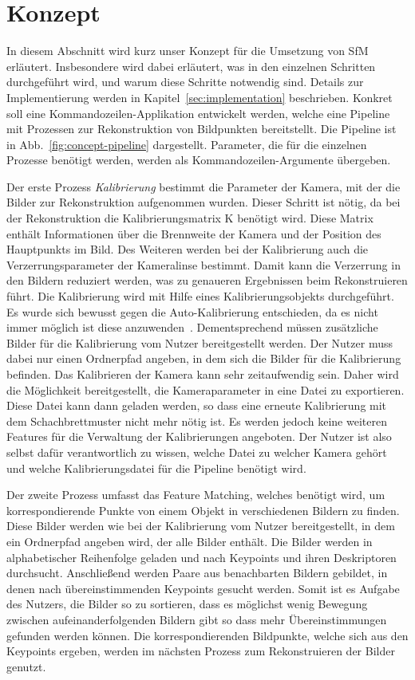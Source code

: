 
\chapter{Konzept}
In diesem Abschnitt wird kurz unser Konzept für die Umsetzung von SfM erläutert. 
Insbesondere wird dabei erläutert, was in den einzelnen Schritten durchgeführt wird, und warum diese Schritte notwendig sind.
Details zur Implementierung werden in Kapitel~\ref{sec:implementation} beschrieben.
Konkret soll eine Kommandozeilen-Applikation entwickelt werden, welche eine Pipeline mit Prozessen zur Rekonstruktion von Bildpunkten bereitstellt.
Die Pipeline ist in Abb.~\ref{fig:concept-pipeline} dargestellt.
Parameter, die für die einzelnen Prozesse benötigt werden, werden als Kommandozeilen-Argumente übergeben.

Der erste Prozess \emph{Kalibrierung} bestimmt die Parameter der Kamera, mit der die Bilder zur Rekonstruktion aufgenommen wurden.
Dieser Schritt ist nötig, da bei der Rekonstruktion die Kalibrierungsmatrix K benötigt wird.
Diese Matrix enthält Informationen über die Brennweite der Kamera und der Position des Hauptpunkts im Bild.
Des Weiteren werden bei der Kalibrierung auch die Verzerrungsparameter der Kameralinse bestimmt.
Damit kann die Verzerrung in den Bildern reduziert werden, was zu genaueren Ergebnissen beim Rekonstruieren führt.
Die Kalibrierung wird mit Hilfe eines Kalibrierungsobjekts durchgeführt.
Es wurde sich bewusst gegen die Auto-Kalibrierung entschieden, da es nicht immer möglich ist diese anzuwenden~\cite{remondino_2005}.
Dementsprechend müssen zusätzliche Bilder für die Kalibrierung vom Nutzer bereitgestellt werden.
Der Nutzer muss dabei nur einen Ordnerpfad angeben, in dem sich die Bilder für die Kalibrierung befinden.
Das Kalibrieren der Kamera kann sehr zeitaufwendig sein.
Daher wird die Möglichkeit bereitgestellt, die Kameraparameter in eine Datei zu exportieren.
Diese Datei kann dann geladen werden, so dass eine erneute Kalibrierung mit dem Schachbrettmuster nicht mehr nötig ist. 
Es werden jedoch keine weiteren Features für die Verwaltung der Kalibrierungen angeboten.
Der Nutzer ist also selbst dafür verantwortlich zu wissen, welche Datei zu welcher Kamera gehört und welche Kalibrierungsdatei für die Pipeline benötigt wird. 

Der zweite Prozess umfasst das Feature Matching, welches benötigt wird, um korrespondierende Punkte von einem Objekt in verschiedenen Bildern zu finden.
Diese Bilder werden wie bei der Kalibrierung vom Nutzer bereitgestellt, in dem ein Ordnerpfad angeben wird, der alle Bilder enthält. 
Die Bilder werden in alphabetischer Reihenfolge geladen und nach Keypoints und ihren Deskriptoren durchsucht.
Anschließend werden Paare aus benachbarten Bildern gebildet, in denen nach übereinstimmenden Keypoints gesucht werden.
Somit ist es Aufgabe des Nutzers, die Bilder so zu sortieren, dass es möglichst wenig Bewegung zwischen aufeinanderfolgenden Bildern gibt so dass mehr Übereinstimmungen gefunden werden können.
Die korrespondierenden Bildpunkte, welche sich aus den Keypoints ergeben, werden im nächsten Prozess zum Rekonstruieren der Bilder genutzt.

